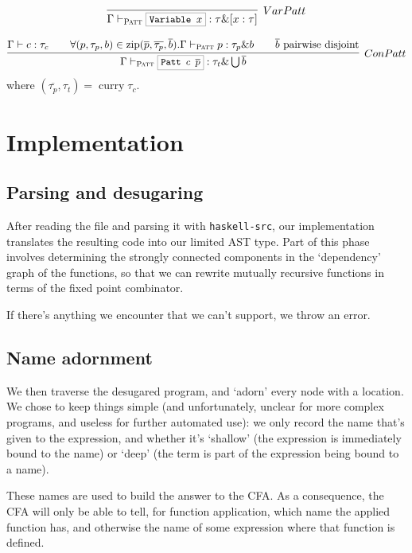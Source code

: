 \documentclass[a4paper]{scrartcl}
\newcommand{\hsterm}[1]{%
    \setlength{\fboxsep}{3pt}%
    \setlength{\fboxrule}{0.2pt}%
    \fbox{\texttt{\small #1}}}
\renewcommand{\vec}[1]{\overline{#1}}
\DeclareMathOperator{\zip}{zip}
\DeclareMathOperator{\curry}{curry}
\begin{document}
\begin{equation*}
\infer[VarPatt]%
    {\Gamma \vdash_\textsc{Patt} \hsterm{Variable \ensuremath{x}} : \tau \& [x : \tau]}%
    {}
\end{equation*}

\begin{equation*}
\infer[ConPatt]%
    {\Gamma \vdash_\textsc{Patt} \hsterm{Patt \ensuremath{c} \ensuremath{\vec{p}}} : \tau_t \& \bigcup \vec{b}}%
    {\Gamma \vdash c : \tau_c
    \qquad \forall (p,\tau_p,b) \in \zip(\vec{p}, \vec{\tau_p}, \vec{b}).
        \Gamma \vdash_\textsc{Patt} p : \tau_p \& b
    \qquad \text{$\vec{b}$ pairwise disjoint}}
\end{equation*}
where $(\vec{\tau_p}, \tau_t) = \curry \tau_c$.

\section{Implementation}
\subsection{Parsing and desugaring}
After reading the file and parsing it with \texttt{haskell-src}, our
implementation translates the resulting code into our limited AST type.
Part of this phase involves determining the strongly connected components
in the `dependency' graph of the functions, so that we can rewrite mutually
recursive functions in terms of the fixed point combinator.

If there's anything we encounter that we can't support, we throw an error.

\subsection{Name adornment}
We then traverse the desugared program, and `adorn' every node with a location.
We chose to keep things simple (and unfortunately, unclear for more complex
programs, and useless for further automated use): we only record the name that's
given to the expression, and whether it's `shallow' (the expression is immediately
bound to the name) or `deep' (the term is part of the expression being bound
to a name).

These names are used to build the answer to the CFA. As a consequence, the CFA
will only be able to tell, for function application, which name the applied
function has, and otherwise the name of some expression where that function
is defined.
\end{document}
